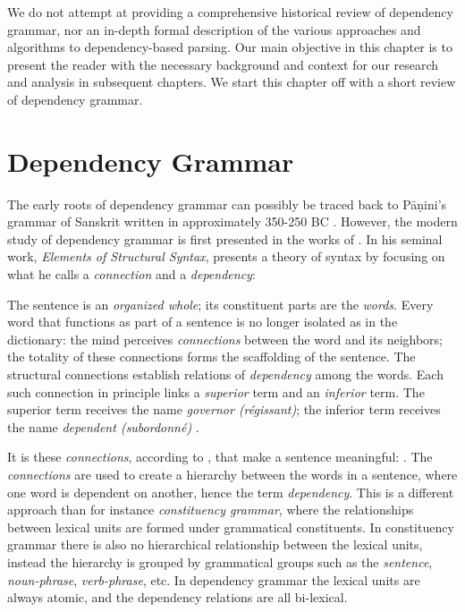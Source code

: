 We do not attempt at providing a comprehensive historical review of dependency grammar, nor an in-depth formal description of the various approaches and algorithms to dependency-based parsing. Our main objective in this chapter is to present the reader with the necessary background and context for our research and analysis in subsequent chapters. We start this chapter off with a short review of dependency grammar.

\section{Dependency Grammar}
\label{grammar}

The early roots of dependency grammar can possibly be traced back to P\={a}\d{n}ini's grammar of Sanskrit written in approximately 350-250 BC \cite{Kruijff:02}. However, the modern study of  dependency grammar is first presented in the works of \citeauthor{Tes:15}. In his seminal work, \textit{Elements of Structural Syntax}, \citeauthor{Tes:15} presents a theory of syntax by focusing on what he calls a \textit{connection} and a \textit{dependency}:

\begin{displayquote}
The sentence is an \textit{organized whole}; its constituent parts are the \textit{words}. Every word that functions as part of a sentence is no longer isolated as in the dictionary: the mind perceives \textit{connections} between the word and its neighbors; the totality of these connections forms the scaffolding of the sentence. The structural connections establish relations of \textit{dependency} among the words. Each such connection in principle links a \textit{superior} term and an \textit{inferior} term. The superior term receives the name \textit{governor (r\'{e}gissant)}; the inferior term receives the name \textit{dependent (subordonn\'{e})} \cite{Tes:15}.
\end{displayquote}

It is these \textit{connections}, according to \citeauthor{Tes:15}, that make a sentence meaningful:  \cite{Tes:15}. The \textit{connections} are used to create a hierarchy between the words in a sentence, where one word is dependent on another, hence the term \textit{dependency}. This is a different approach than for instance \textit{constituency grammar}, where the relationships between lexical units are formed under grammatical constituents. In constituency grammar there is also no hierarchical relationship between the lexical units, instead the hierarchy is grouped by grammatical groups such as the \textit{sentence}, \textit{noun-phrase}, \textit{verb-phrase}, etc. In dependency grammar the lexical units are always atomic, and the dependency relations are all bi-lexical.

